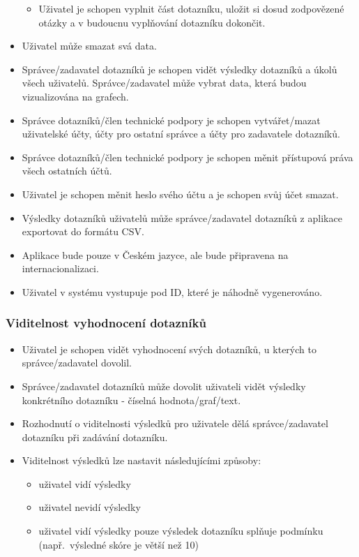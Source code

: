 \begin{itemize}
  \begin{itemize}
  \item
    Uživatel je schopen vyplnit část dotazníku, uložit si dosud zodpovězené otázky a v budoucnu vyplňování dotazníku dokončit.
  \end{itemize}
\item
  Uživatel může smazat svá data.
\item
  Správce/zadavatel dotazníků je schopen vidět výsledky dotazníků a úkolů všech uživatelů.
  Správce/zadavatel může vybrat data, která budou vizualizována na grafech.
\item
  Správce dotazníků/člen technické podpory je schopen vytvářet/mazat uživatelské účty, účty pro ostatní správce a účty pro zadavatele dotazníků.
\item
  Správce dotazníků/člen technické podpory je schopen měnit přístupová práva všech ostatních účtů.
\item
  Uživatel je schopen měnit heslo svého účtu a je schopen svůj účet smazat.
\item
  Výsledky dotazníků uživatelů může správce/zadavatel dotazníků z aplikace exportovat do formátu CSV\@.
\item
  Aplikace bude pouze v Českém jazyce, ale bude připravena na internacionalizaci.
\item
  Uživatel v systému vystupuje pod ID, které je náhodně vygenerováno.
\end{itemize}


\subsubsection{Viditelnost vyhodnocení dotazníků}

\begin{itemize}
\item
  Uživatel je schopen vidět vyhodnocení svých dotazníků, u kterých to správce/zadavatel dovolil.
\item
  Správce/zadavatel dotazníků může dovolit uživateli vidět výsledky konkrétního dotazníku - číselná hodnota/graf/text.
\item
  Rozhodnutí o viditelnosti výsledků pro uživatele dělá správce/zadavatel dotazníku při zadávání dotazníku.
\item
  Viditelnost výsledků lze nastavit následujícími způsoby:

  \begin{itemize}
  \item
    uživatel vidí výsledky
  \item
    uživatel nevidí výsledky
  \item
    uživatel vidí výsledky pouze výsledek dotazníku splňuje podmínku (např.\ výsledné skóre je větší než 10)
  \end{itemize}
\end{itemize}



